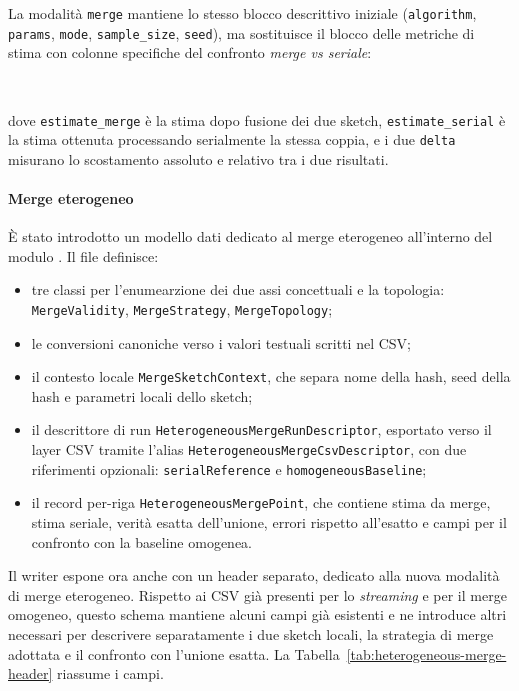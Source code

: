 La modalità \texttt{merge} mantiene lo stesso blocco descrittivo iniziale
(\texttt{algorithm}, \texttt{params}, \texttt{mode}, \texttt{sample\_size}, \texttt{seed}),
ma sostituisce il blocco delle metriche di stima con colonne specifiche del confronto
\emph{merge vs seriale}:
\begin{center}
\small
{}\
\end{center}
dove \texttt{estimate\_merge} è la stima dopo fusione dei due sketch,
\texttt{estimate\_serial} è la stima ottenuta processando serialmente la stessa coppia,
e i due \texttt{delta} misurano lo scostamento assoluto e relativo tra i due risultati.

\paragraph{Merge eterogeneo}
\`E stato introdotto un modello dati dedicato al merge eterogeneo all'interno del modulo
\codepath{simulation}. Il file
 definisce:
\begin{itemize}
    \item tre classi per l'enumearzione dei due assi concettuali e la topologia:
    \texttt{MergeValidity}, \texttt{MergeStrategy}, \texttt{MergeTopology};
    \item le conversioni canoniche \codepath{toString(...)} verso i valori
    testuali scritti nel CSV;
    \item il contesto locale \texttt{MergeSketchContext}, che separa nome della
    hash, seed della hash e parametri locali dello sketch;
    \item il descrittore di run \texttt{HeterogeneousMergeRunDescriptor},
    esportato verso il layer CSV tramite l'alias
    \texttt{HeterogeneousMergeCsvDescriptor}, con due riferimenti opzionali:
    \texttt{serialReference} e \texttt{homogeneousBaseline};
    \item il record per-riga \texttt{HeterogeneousMergePoint}, che contiene
    stima da merge, stima seriale, verità esatta dell'unione, errori rispetto
    all'esatto e campi per il confronto con la baseline omogenea.
\end{itemize}

Il writer  espone ora anche
 con un header separato, dedicato
alla nuova modalità di merge eterogeneo. Rispetto ai CSV già presenti per lo
\emph{streaming} e per il merge omogeneo, questo schema mantiene alcuni campi
già esistenti e ne introduce altri necessari per descrivere separatamente i
due sketch locali, la strategia di merge adottata e il confronto con l'unione
esatta. La Tabella~\ref{tab:heterogeneous-merge-header} riassume i campi.

